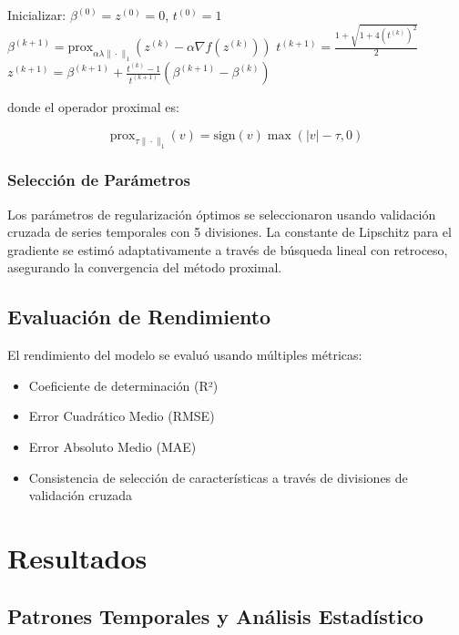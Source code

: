 \documentclass[conference]{IEEEtran}
\begin{document}
\begin{algorithmic}
\STATE Inicializar: $\beta^{(0)} = z^{(0)} = 0$, $t^{(0)} = 1$
    \STATE $\beta^{(k+1)} = \text{prox}_{\alpha\lambda\|\cdot\|_1}(z^{(k)} - \alpha \nabla f(z^{(k)}))$
    \STATE $t^{(k+1)} = \frac{1 + \sqrt{1 + 4(t^{(k)})^2}}{2}$
    \STATE $z^{(k+1)} = \beta^{(k+1)} + \frac{t^{(k)} - 1}{t^{(k+1)}}(\beta^{(k+1)} - \beta^{(k)})$
\ENDFOR
\end{algorithmic}

donde el operador proximal es:

\begin{equation}
\text{prox}_{\tau\|\cdot\|_1}(v) = \text{sign}(v) \max(|v| - \tau, 0)
\end{equation}

\subsubsection{Selección de Parámetros}

Los parámetros de regularización óptimos se seleccionaron usando validación cruzada de series temporales con 5 divisiones. La constante de Lipschitz para el gradiente se estimó adaptativamente a través de búsqueda lineal con retroceso, asegurando la convergencia del método proximal.

\subsection{Evaluación de Rendimiento}

El rendimiento del modelo se evaluó usando múltiples métricas:
\begin{itemize}
    \item Coeficiente de determinación (R²)
    \item Error Cuadrático Medio (RMSE)
    \item Error Absoluto Medio (MAE)
    \item Consistencia de selección de características a través de divisiones de validación cruzada
\end{itemize}

\section{Resultados}

\subsection{Patrones Temporales y Análisis Estadístico}
\end{document}
